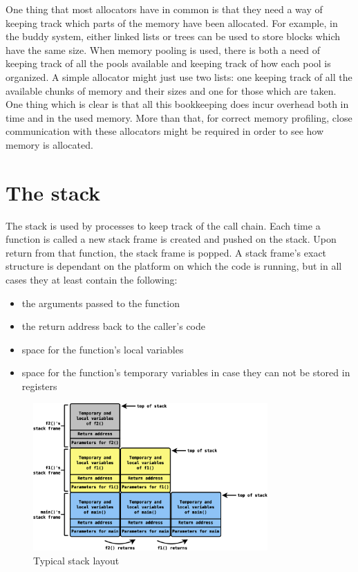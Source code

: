 One thing that most allocators have in common is that they need a way of keeping track which parts of the memory have been allocated. For example, in the buddy system, either linked lists or trees can be used to store blocks which have the same size. When memory pooling is used, there is both a need of keeping track of all the pools available and keeping track of how each pool is organized. A simple allocator might just use two lists: one keeping track of all the available chunks of memory and their sizes and one for those which are taken. One thing which is clear is that all this bookkeeping does incur overhead both in time and in the used memory. More than that, for correct memory profiling, close communication with these allocators might be required in order to see how memory is allocated.

\section{The stack}
\label{section:stack}

The stack is used by processes to keep track of the call chain. Each time a function is called a new stack frame is created and pushed on the stack. Upon return from that function, the stack frame is popped. A stack frame's exact structure is dependant on the platform on which the code is running, but in all cases they at least contain the following:

\begin{itemize}
\item the arguments passed to the function
\item the return address back to the caller's code
\item space for the function's local variables
\item space for the function's temporary variables in case they can not be stored in registers
\end{itemize}

\begin{figure}[htb]
\centering
\includegraphics[width=0.8\textwidth]{src/img/stacklayout}
\caption{Typical stack layout}
\label{fig:stacklayout}
\end{figure}


